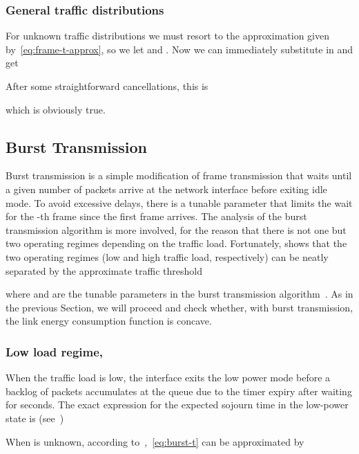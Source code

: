 \documentclass[journal,english,twocolumn,10pt,letterpaper]{IEEEtran}
\newcommand{\added}[1]{{#1}}
\begin{document}
\subsubsection{General traffic distributions}
\label{sec:gener-traff-distr}

For unknown traffic distributions we must resort to the approximation given
by~\eqref{eq:frame-t-approx}, so we let  and
. Now we can immediately substitute in
 and get

After some straightforward cancellations, this is 

which is obviously true.

\subsection{Burst Transmission}

Burst transmission is a simple modification of frame transmission that waits
until a given number of packets  arrive at the network interface before
exiting idle mode. To avoid excessive delays, there is a tunable parameter
 that limits the wait for the -th frame since the first frame
arrives. The analysis of the burst transmission algorithm is more involved,
for the reason that there is not one but two operating regimes depending on
the traffic load. Fortunately,
\added{\cite{herreria12:_gi_g_model_gb_energ_effic_ether} shows that} the two
operating regimes (low and high traffic load, respectively) can be neatly
separated by the approximate traffic threshold

where  and  are the tunable parameters in the burst transmission
algorithm~\cite{herreria11:_power_savin_model_burst_trans}. As in the previous
Section, we will proceed and check whether, with burst transmission, the link
energy consumption function is concave.

\subsubsection{Low load regime, }
\label{sec:low-load-regime}

When the traffic load is low, the interface exits the low power mode before a
backlog of  packets accumulates at the queue due to the timer expiry
after waiting for  seconds. The exact expression for the expected
sojourn time in the low-power state is
(see~\cite{herreria12:_gi_g_model_gb_energ_effic_ether})

When  is unknown, \added{according
  to~\cite{herreria12:_gi_g_model_gb_energ_effic_ether}},~\eqref{eq:burst-t}
can be approximated by
\end{document}
